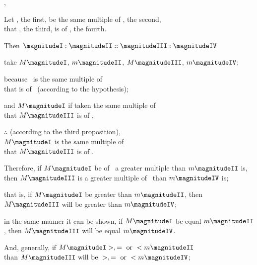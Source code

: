\documentclass[booklanguage=english]{byrnebook}
\begin{document}
, %

\begin{center}
Let , the first, be the same multiple of , the second, \\
that , the third, is of , the fourth.

Then $\magnitudeI : \magnitudeII :: \magnitudeIII : \magnitudeIV$

take $M \magnitudeI$, $m \magnitudeII$, $M \magnitudeIII$, $m \magnitudeIV$;

because \magnitudeI\ is the same multiple of \magnitudeII \\
that \magnitudeIII is of \magnitudeIV\ (according to the hypothesis);

and $M \magnitudeI$ if taken the same multiple of \magnitudeI \\
that $M \magnitudeIII$ is of \magnitudeIII,

$\therefore$ (according to the third proposition),\\
$M \magnitudeI$ is the same multiple of \magnitudeII \\
that $M \magnitudeIII$ is of \magnitudeIV.

Therefore, if $M \magnitudeI$ be of \magnitudeII\ a greater multiple than $m \magnitudeII$ is, \\
then $M \magnitudeIII$ is a greater multiple of \magnitudeIV\ than $m \magnitudeIV$ is;

that is, if $M \magnitudeI$ be greater than $m \magnitudeII$, then $M \magnitudeIII$ will be greater than $m \magnitudeIV$;

in the same manner it can be shown, if $M \magnitudeI$ be equal $m \magnitudeII$, then $M \magnitudeIII$ will be equal $m \magnitudeIV$.

And, generally, if $M \magnitudeI >, = \mbox{ or } < m \magnitudeII$\\
than $M \magnitudeIII \mbox{ will be } >, = \mbox{ or } < m \magnitudeIV$;


\end{center}
\end{document}
